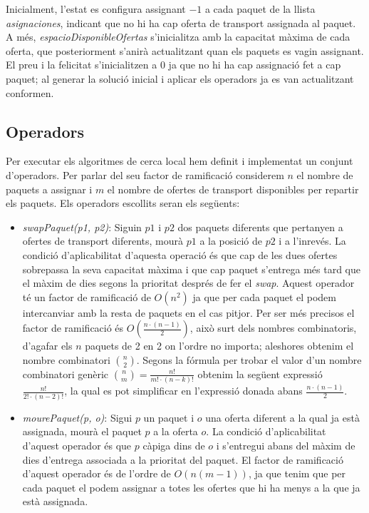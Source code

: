 \documentclass[a4paper]{article}
\begin{document}
	Inicialment, l'estat es configura assignant $-1$ a cada paquet de la llista \emph{asignaciones}, indicant que no hi ha cap oferta de transport assignada al paquet. A més, \emph{espacioDisponibleOfertas} s'inicialitza amb la capacitat màxima de cada oferta, que posteriorment s'anirà actualitzant quan els paquets es vagin assignant. El preu i la felicitat s'inicialitzen a $0$ ja que no hi ha cap assignació fet a cap paquet; al generar la solució inicial i aplicar els operadors ja es van actualitzant conformen.\\
	
	\subsection{Operadors}
	
	Per executar els algoritmes de cerca local hem definit i implementat un conjunt d'operadors. Per parlar del seu factor de ramificació considerem $n$ el nombre de paquets a assignar i $m$ el nombre de ofertes de transport disponibles per repartir els paquets. Els operadors escollits seran els següents:
	
	\begin{itemize}
		\item \emph{swapPaquet(p1, p2)}: Siguin $p1$ i $p2$ dos paquets diferents que pertanyen a ofertes de transport diferents, mourà $p1$ a la posició de $p2$ i a l'inrevés. La condició d'aplicabilitat d'aquesta operació és que cap de les dues ofertes sobrepassa la seva capacitat màxima i que cap paquet s'entrega més tard que el màxim de dies segons la prioritat després de fer el \textit{swap}. Aquest operador té un factor de ramificació de $O(n^2)$ ja que per cada paquet el podem intercanviar amb la resta de paquets en el cas pitjor. Per ser més precisos el factor de ramificació és $O(\frac{n·(n-1)}{2})$, això surt dels nombres combinatoris, d'agafar els $n$ paquets de 2 en 2 on l'ordre no importa; aleshores obtenim el nombre combinatori $\binom{n}{2}$. Segons la fórmula per trobar el valor d'un nombre combinatori genèric $\binom{n}{m} = \frac{n!}{m!·(n-k)!}$ obtenim la següent expressió $\frac{n!}{2!·(n-2)!}$, la qual es pot simplificar en l'expressió donada abans $\frac{n·(n-1)}{2}$.


		\item \emph{mourePaquet(p, o)}: Sigui $p$ un paquet i $o$ una oferta diferent a la qual ja està assignada, mourà el paquet $p$ a la oferta $o$. La condició d'aplicabilitat d'aquest operador és que $p$ càpiga dins de $o$ i s'entregui abans del màxim de dies d'entrega associada a la prioritat del paquet. El factor de ramificació d'aquest operador és de l'ordre de $O(n(m-1))$, ja que tenim que per cada paquet el podem assignar a totes les ofertes que hi ha menys a la que ja està assignada.
	\end{itemize}
	
\end{document}
